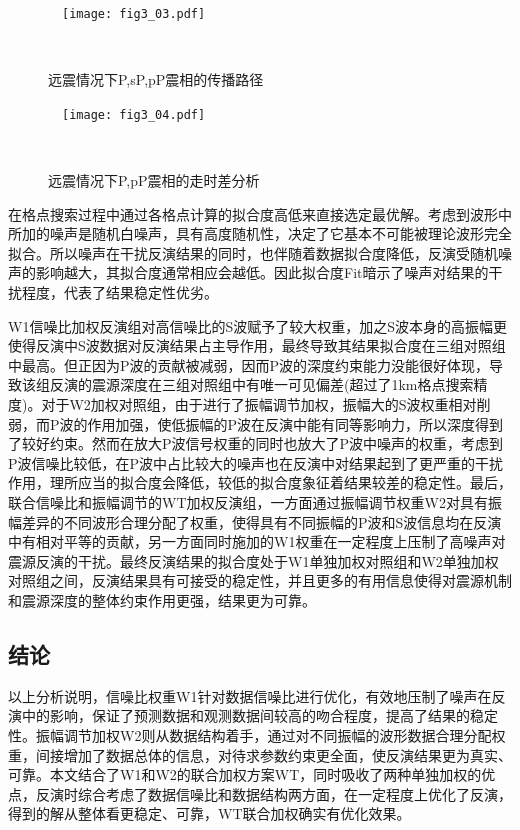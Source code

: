 \begin{figure}
\centering
  \texttt{[image: fig3\_03.pdf]}
  \caption{远震情况下P,sP,pP震相的传播路径\citep{Stein2003}}
  \label{fig3_03}
\end{figure}
\begin{figure}
\centering
  \texttt{[image: fig3\_04.pdf]}
  \caption{远震情况下P,pP震相的走时差分析\citep{Stein2003}}
  \label{fig3_04}
\end{figure}

在格点搜索过程中通过各格点计算的拟合度高低来直接选定最优解。考虑到波形中所加的噪声是随机白噪声，具有高度随机性，决定了它基本不可能被理论波形完全拟合。所以噪声在干扰反演结果的同时，也伴随着数据拟合度降低，反演受随机噪声的影响越大，其拟合度通常相应会越低。因此拟合度Fit暗示了噪声对结果的干扰程度，代表了结果稳定性优劣。

W1信噪比加权反演组对高信噪比的S波赋予了较大权重，加之S波本身的高振幅更使得反演中S波数据对反演结果占主导作用，最终导致其结果拟合度在三组对照组中最高。但正因为P波的贡献被减弱，因而P波的深度约束能力没能很好体现，导致该组反演的震源深度在三组对照组中有唯一可见偏差(超过了1km格点搜索精度)。对于W2加权对照组，由于进行了振幅调节加权，振幅大的S波权重相对削弱，而P波的作用加强，使低振幅的P波在反演中能有同等影响力，所以深度得到了较好约束。然而在放大P波信号权重的同时也放大了P波中噪声的权重，考虑到P波信噪比较低，在P波中占比较大的噪声也在反演中对结果起到了更严重的干扰作用，理所应当的拟合度会降低，较低的拟合度象征着结果较差的稳定性。最后，联合信噪比和振幅调节的WT加权反演组，一方面通过振幅调节权重W2对具有振幅差异的不同波形合理分配了权重，使得具有不同振幅的P波和S波信息均在反演中有相对平等的贡献，另一方面同时施加的W1权重在一定程度上压制了高噪声对震源反演的干扰。最终反演结果的拟合度处于W1单独加权对照组和W2单独加权对照组之间，反演结果具有可接受的稳定性，并且更多的有用信息使得对震源机制和震源深度的整体约束作用更强，结果更为可靠。

\subsection{结论}
以上分析说明，信噪比权重W1针对数据信噪比进行优化，有效地压制了噪声在反演中的影响，保证了预测数据和观测数据间较高的吻合程度，提高了结果的稳定性。振幅调节加权W2则从数据结构着手，通过对不同振幅的波形数据合理分配权重，间接增加了数据总体的信息，对待求参数约束更全面，使反演结果更为真实、可靠。本文结合了W1和W2的联合加权方案WT，同时吸收了两种单独加权的优点，反演时综合考虑了数据信噪比和数据结构两方面，在一定程度上优化了反演，得到的解从整体看更稳定、可靠，WT联合加权确实有优化效果。

